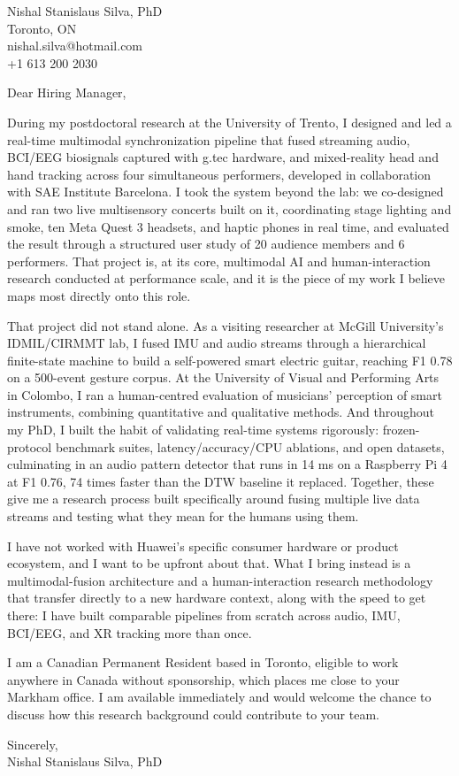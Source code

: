 \documentclass[11pt]{article}
\begin{document}
\pagestyle{empty}

\begin{flushright}
Nishal Stanislaus Silva, PhD \\
Toronto, ON \\
nishal.silva@hotmail.com \\
+1 613 200 2030
\end{flushright}

Dear Hiring Manager,

During my postdoctoral research at the University of Trento, I designed and led a real-time multimodal synchronization pipeline that fused streaming audio, BCI/EEG biosignals captured with g.tec hardware, and mixed-reality head and hand tracking across four simultaneous performers, developed in collaboration with SAE Institute Barcelona. I took the system beyond the lab: we co-designed and ran two live multisensory concerts built on it, coordinating stage lighting and smoke, ten Meta Quest 3 headsets, and haptic phones in real time, and evaluated the result through a structured user study of 20 audience members and 6 performers. That project is, at its core, multimodal AI and human-interaction research conducted at performance scale, and it is the piece of my work I believe maps most directly onto this role.

That project did not stand alone. As a visiting researcher at McGill University's IDMIL/CIRMMT lab, I fused IMU and audio streams through a hierarchical finite-state machine to build a self-powered smart electric guitar, reaching F1 0.78 on a 500-event gesture corpus. At the University of Visual and Performing Arts in Colombo, I ran a human-centred evaluation of musicians' perception of smart instruments, combining quantitative and qualitative methods. And throughout my PhD, I built the habit of validating real-time systems rigorously: frozen-protocol benchmark suites, latency/accuracy/CPU ablations, and open datasets, culminating in an audio pattern detector that runs in 14 ms on a Raspberry Pi 4 at F1 0.76, 74 times faster than the DTW baseline it replaced. Together, these give me a research process built specifically around fusing multiple live data streams and testing what they mean for the humans using them.

I have not worked with Huawei's specific consumer hardware or product ecosystem, and I want to be upfront about that. What I bring instead is a multimodal-fusion architecture and a human-interaction research methodology that transfer directly to a new hardware context, along with the speed to get there: I have built comparable pipelines from scratch across audio, IMU, BCI/EEG, and XR tracking more than once.

I am a Canadian Permanent Resident based in Toronto, eligible to work anywhere in Canada without sponsorship, which places me close to your Markham office. I am available immediately and would welcome the chance to discuss how this research background could contribute to your team.

Sincerely, \\
Nishal Stanislaus Silva, PhD
\end{document}

